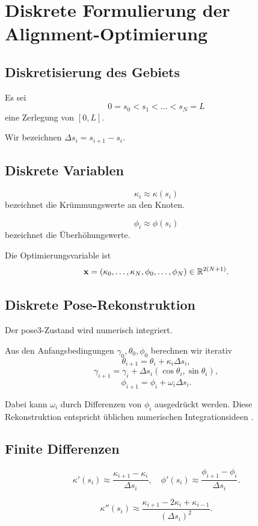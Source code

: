 \section{Diskrete Formulierung der Alignment-Optimierung}
\subsection{Diskretisierung des Gebiets}
\begin{definition}[Diskretisierung]
Es sei
\[
0=s_0<s_1<\dots<s_N=L
\]
eine Zerlegung von \([0,L]\).
\end{definition}
Wir bezeichnen \(\Delta s_i=s_{i+1}-s_i\).

\subsection{Diskrete Variablen}
\begin{definition}
\[\kappa_i\approx\kappa(s_i)\]
bezeichnet die Krümmungswerte an den Knoten.
\end{definition}
\begin{definition}
\[\phi_i\approx\phi(s_i)\]
bezeichnet die Überhöhungswerte.
\end{definition}
\begin{definition}[Parametervektor]
Die Optimierungsvariable ist
\[
\mathbf x=(\kappa_0,\dots,\kappa_N,\phi_0,\dots,\phi_N)\in\mathbb{R}^{2(N+1)}.
\]
\end{definition}

\subsection{Diskrete Pose-Rekonstruktion}
Der pose3-Zustand wird numerisch integriert.
\begin{definition}
Aus den Anfangsbedingungen \(\gamma_0,\theta_0,\phi_0\) berechnen wir iterativ
\[
\theta_{i+1}=\theta_i+\kappa_i\Delta s_i,
\]
\[
\gamma_{i+1}=\gamma_i+\Delta s_i(\cos\theta_i,\sin\theta_i),
\]
\[
\phi_{i+1}=\phi_i+\omega_i\Delta s_i.
\]
\end{definition}
Dabei kann \(\omega_i\) durch Differenzen von \(\phi_i\) ausgedrückt werden.
Diese Rekonstruktion entspricht üblichen numerischen Integrationsideen
\cite{Hairer1993ODE,Press2007NumericalRecipes}.

\subsection{Finite Differenzen}
\begin{definition}
\[
\kappa'(s_i)\approx\frac{\kappa_{i+1}-\kappa_i}{\Delta s_i},
\quad
\phi'(s_i)\approx\frac{\phi_{i+1}-\phi_i}{\Delta s_i}.
\]
\end{definition}
\begin{definition}
\[
\kappa''(s_i)\approx
\frac{\kappa_{i+1}-2\kappa_i+\kappa_{i-1}}{(\Delta s_i)^2}.
\]
\end{definition}

